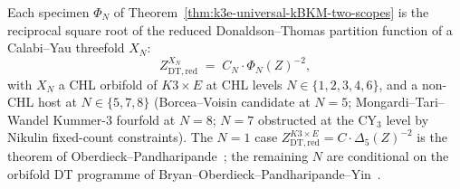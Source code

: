 \begin{conjecture}
\label{conj:k3e-lorgat-conj1-two-scope}
Each specimen $\Phi_N$ of Theorem~\ref{thm:k3e-universal-kBKM-two-scopes} is the reciprocal square root of the reduced Donaldson--Thomas partition function of a Calabi--Yau threefold $X_N$:
\[
 Z^{X_N}_{\mathrm{DT}, \mathrm{red}} \;=\; C_N \cdot \Phi_N(Z)^{-2},
\]
with $X_N$ a CHL orbifold of $K3 \times E$ at CHL levels $N \in \{1, 2, 3, 4, 6\}$, and a non-CHL host at $N \in \{5, 7, 8\}$ (Borcea--Voisin candidate at $N = 5$; Mongardi--Tari--Wandel Kummer-$3$ fourfold at $N = 8$; $N = 7$ obstructed at the CY$_3$ level by Nikulin fixed-count constraints). The $N = 1$ case $Z^{K3 \times E}_{\mathrm{DT}, \mathrm{red}} = C \cdot \Delta_5(Z)^{-2}$ is the theorem of Oberdieck--Pandharipande~\cite{OberdieckPandharipande2018}; the remaining $N$ are conditional on the orbifold DT programme of Bryan--Oberdieck--Pandharipande--Yin~\cite{BOPY2018}.


\end{conjecture}
